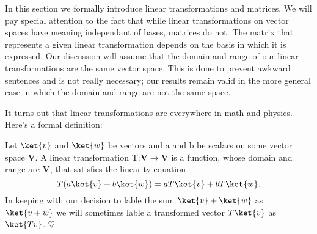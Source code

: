 In this section we formally introduce linear transformations and matrices.  We will pay special attention to the fact that while linear transformations on vector spaces have meaning independant of bases, matrices do not.  The matrix that represents a given linear transformation depends on the basis in which it is expressed.  Our discussion will assume that the domain and range of our linear transformations are the same vector space.  This is done to prevent awkward sentences and is not really necessary; our results remain valid in the more general case in which the domain and range are not the same space.

It turns out that linear transformations are everywhere in math and physics. Here's a formal definition:

\begin{definition}
Let $\ket{v}$ and $\ket{w}$ be vectors and a and b be scalars on some vector space \textbf{V}.  A linear transformation T:\textbf{V}$\rightarrow$\textbf{V} is a function, whose domain and range are \textbf{V}, that satisfies the linearity equation
\begin{displaymath}
T(a\ket{v} + b\ket{w}) = aT\ket{v} + bT\ket{w}.
\end{displaymath}
In keeping with our decision to lable the sum $\ket{v} + \ket{w}$ as $\ket{v+w}$ we will sometimes lable a transformed vector $T\ket{v}$ as $\ket{Tv}$. \qquad $\heartsuit$
\end{definition}

